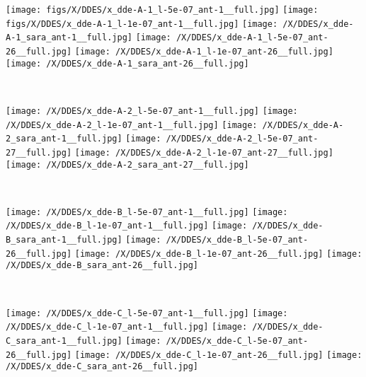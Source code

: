 \begin{figure*}
\begin{minipage}[t]{1\linewidth}
\centering
\texttt{[image: figs/X/DDES/x\_dde-A-1\_l-5e-07\_ant-1\_\_full.jpg]}
\texttt{[image: figs/X/DDES/x\_dde-A-1\_l-1e-07\_ant-1\_\_full.jpg]}
\texttt{[image: /X/DDES/x\_dde-A-1\_sara\_ant-1\_\_full.jpg]}
\texttt{[image: /X/DDES/x\_dde-A-1\_l-5e-07\_ant-26\_\_full.jpg]}
\texttt{[image: /X/DDES/x\_dde-A-1\_l-1e-07\_ant-26\_\_full.jpg]}
\texttt{[image: /X/DDES/x\_dde-A-1\_sara\_ant-26\_\_full.jpg]}
\end{minipage}
~\\
\begin{minipage}[t]{1\linewidth}
\centering
\texttt{[image: /X/DDES/x\_dde-A-2\_l-5e-07\_ant-1\_\_full.jpg]}
\texttt{[image: /X/DDES/x\_dde-A-2\_l-1e-07\_ant-1\_\_full.jpg]}
\texttt{[image: /X/DDES/x\_dde-A-2\_sara\_ant-1\_\_full.jpg]}
\texttt{[image: /X/DDES/x\_dde-A-2\_l-5e-07\_ant-27\_\_full.jpg]}
\texttt{[image: /X/DDES/x\_dde-A-2\_l-1e-07\_ant-27\_\_full.jpg]}
\texttt{[image: /X/DDES/x\_dde-A-2\_sara\_ant-27\_\_full.jpg]}
\end{minipage}
~\\
\begin{minipage}[t]{1\linewidth}\centering
\texttt{[image: /X/DDES/x\_dde-B\_l-5e-07\_ant-1\_\_full.jpg]}
\texttt{[image: /X/DDES/x\_dde-B\_l-1e-07\_ant-1\_\_full.jpg]}
\texttt{[image: /X/DDES/x\_dde-B\_sara\_ant-1\_\_full.jpg]}
\texttt{[image: /X/DDES/x\_dde-B\_l-5e-07\_ant-26\_\_full.jpg]}
\texttt{[image: /X/DDES/x\_dde-B\_l-1e-07\_ant-26\_\_full.jpg]}
\texttt{[image: /X/DDES/x\_dde-B\_sara\_ant-26\_\_full.jpg]}
\end{minipage}
~\\
\begin{minipage}[t]{1\linewidth}\centering
\texttt{[image: /X/DDES/x\_dde-C\_l-5e-07\_ant-1\_\_full.jpg]}
\texttt{[image: /X/DDES/x\_dde-C\_l-1e-07\_ant-1\_\_full.jpg]}
\texttt{[image: /X/DDES/x\_dde-C\_sara\_ant-1\_\_full.jpg]}
\texttt{[image: /X/DDES/x\_dde-C\_l-5e-07\_ant-26\_\_full.jpg]}
\texttt{[image: /X/DDES/x\_dde-C\_l-1e-07\_ant-26\_\_full.jpg]}
\texttt{[image: /X/DDES/x\_dde-C\_sara\_ant-26\_\_full.jpg]}

\end{minipage}
\end{figure*}
